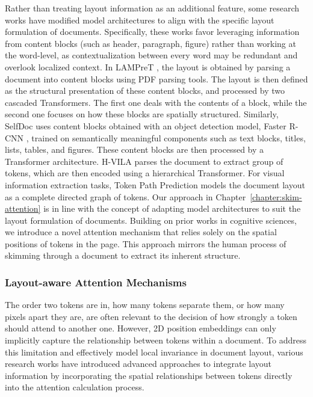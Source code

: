 Rather than treating layout information as an additional feature, some research works have modified model architectures to align with the specific layout formulation of documents. Specifically, these works favor leveraging information from content blocks (such as header, paragraph, figure) rather than working at the word-level, as contextualization between every word may be redundant and overlook localized context. In \ac{LAMPreT} \citep{wu2021lampret}, the layout is obtained by parsing a document into content blocks using PDF parsing tools. The layout is then defined as the structural presentation of these content blocks, and processed by two cascaded Transformers. The first one deals with the contents of a block, while the second one focuses on how these blocks are spatially structured. Similarly, SelfDoc \citep{li2021selfdoc} uses content blocks obtained with an object detection model, Faster R-CNN \citep{ren2015faster}, trained on semantically meaningful components such as text blocks, titles, lists, tables, and figures. These content blocks are then processed by a Transformer architecture. H-VILA \citep{shen2022vila} parses the document to extract group of tokens, which are then encoded using a hierarchical Transformer. For visual information extraction tasks, Token Path Prediction \citep{zhang2023reading} models the document layout as a complete directed graph of tokens. Our approach  in Chapter~\ref{chapter:skim-attention} is in line with the concept of adapting model architectures to suit the layout formulation of documents. Building on prior works in cognitive sciences, we introduce a novel attention mechanism that relies solely on the spatial positions of tokens in the page. This approach mirrors the human process of skimming through a document to extract its inherent structure.


\subsubsection{Layout-aware Attention Mechanisms}
\label{section:related-document-understanding-layout-aware-attention}

The order two tokens are in, how many tokens separate them, or how many pixels apart they are, are often relevant to the decision of how strongly a token should attend to another one. However, 2D position embeddings can only implicitly capture the relationship between tokens within a document. To address this limitation and effectively model local invariance in document layout, various research works have introduced advanced approaches to integrate layout information by incorporating the spatial relationships between tokens directly into the attention calculation process.


